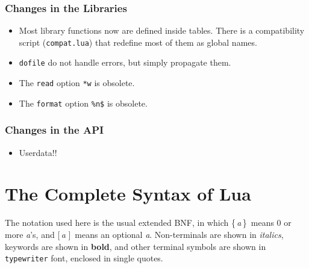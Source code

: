 \documentclass[11pt,twoside,draft]{article}
\renewcommand{\rep}[1]{{\rm\{}\,#1\,{\rm\}}}
\renewcommand{\opt}[1]{{\rm [}\,#1\,{\,\rm]}}
\begin{document}
\subsubsection*{Changes in the Libraries}
\begin{itemize}

\item
Most library functions now are defined inside tables.
There is a compatibility script (\verb|compat.lua|) that
redefine most of them as global names.

\item
\verb|dofile| do not handle errors, but simply propagate them.

\item
The \verb|read| option \verb|*w| is obsolete.

\item
The \verb|format| option \verb|%n$| is obsolete.

\end{itemize}


\subsubsection*{Changes in the API}
\begin{itemize}

\item
Userdata!!

\end{itemize}

\newpage
\section*{The Complete Syntax of Lua} \label{BNF}

The notation used here is the usual extended BNF,
in which
\rep{\emph{a}}~means 0 or more \emph{a}'s, and
\opt{\emph{a}}~means an optional \emph{a}.
Non-terminals are shown in \emph{italics},
keywords are shown in {\bf bold},
and other terminal symbols are shown in {\tt typewriter} font,
enclosed in single quotes.


\renewenvironment{Produc}{\vspace{0.8ex}\par\noindent\hspace{3ex}\it\begin{tabular}{rrl}}{\end{tabular}\vspace{0.8ex}\par\noindent}
\end{document}
